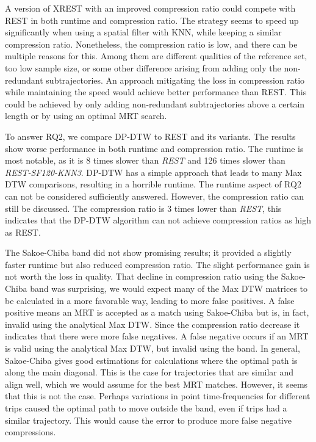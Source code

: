 A version of XREST with an improved compression ratio could compete with REST in both runtime and compression ratio. The strategy seems to speed up significantly when using a spatial filter with KNN, while keeping a similar compression ratio. Nonetheless, the compression ratio is low, and there can be multiple reasons for this. Among them are different qualities of the reference set, too low sample size, or some other difference arising from adding only the non-redundant subtrajectories. An approach mitigating the loss in compression ratio while maintaining the speed would achieve better performance than REST. This could be achieved by only adding non-redundant subtrajectories above a certain length or by using an optimal MRT search.

To answer RQ2, we compare DP-DTW to REST and its variants. The results show worse performance in both runtime and compression ratio. The runtime is most notable, as it is 8 times slower than \textit{REST} and 126 times slower than \textit{REST-SF120-KNN3}. DP-DTW has a simple approach that leads to many Max DTW comparisons, resulting in a horrible runtime. The runtime aspect of RQ2 can not be considered sufficiently answered. However, the compression ratio can still be discussed. The compression ratio is 3 times lower than \textit{REST}, this indicates that the DP-DTW algorithm can not achieve compression ratios as high as REST.

The Sakoe-Chiba band did not show promising results; it provided a slightly faster runtime but also reduced compression ratio. The slight performance gain is not worth the loss in quality. That decline in compression ratio using the Sakoe-Chiba band was surprising, we would expect many of the Max DTW matrices to be calculated in a more favorable way, leading to more false positives. A false positive means an MRT is accepted as a match using Sakoe-Chiba but is, in fact, invalid using the analytical Max DTW. Since the compression ratio decrease it indicates that there were more false negatives. A false negative occurs if an MRT is valid using the analytical Max DTW, but invalid using the band. In general, Sakoe-Chiba gives good estimations for calculations where the optimal path is along the main diagonal. This is the case for trajectories that are similar and align well, which we would assume for the best MRT matches. However, it seems that this is not the case. Perhaps variations in point time-frequencies for different trips caused the optimal path to move outside the band, even if trips had a similar trajectory. This would cause the error to produce more false negative compressions.

